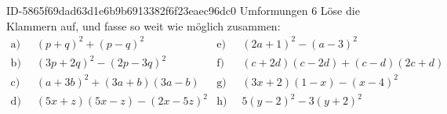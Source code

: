 \begin{exercise}
      {ID-5865f69dad63d1e6b9b6913382f6f23eaec96dc0}
      {Umformungen 6}
  \ifproblem\problem
    \newcommand{\gap}{\;\;}%
    Löse die Klammern auf, und fasse so weit wie möglich zusammen:
    \begin{align*}
      \text{a)}\gap & (p+q)^2+(p-q)^2 &
      \text{e)}\gap & (2a+1)^2-(a-3)^2
      \\
      \text{b)}\gap & (3p+2q)^2-(2p-3q)^2 &
      \text{f)}\gap & (c+2d)(c-2d)+(c-d)(2c+d)
      \\
      \text{c)}\gap & (a+3b)^2+(3a+b)(3a-b) &
      \text{g)}\gap & (3x+2)(1-x)-(x-4)^2
      \\
      \text{d)}\gap & (5x+z)(5x-z)-(2x-5z)^2 &
      \text{h)}\gap & 5(y-2)^2-3(y+2)^2
    \end{align*}
  \fi
  \ifoutcome\outcome
    \newcommand{\toprow}[2]
    {%
      \makebox[1.5em][r]{\ensuremath{\displaystyle#1}}%
      &\phantom{\,=\:\,}%
      \makebox[18.5em][l]{\ensuremath{\displaystyle#2}}%
    }%
    \newcommand{\solutionA}
    {%
      \begin{equation*}
        \begin{split}
          \toprow{\text{a)}}{(p+q)^2+(p-q)^2} \\
          &=p^2+2pq+q^2+p^2-2pq+q^2           \\
          &=p^2+p^2+2pq-2pq+q^2+q^2           \\
          &=2p^2+2q^2                         \\
          &=2\left(p^2+q^2\right)
        \end{split}
      \end{equation*}
    }%
    \newcommand{\solutionB}
    {%
      \begin{equation*}
        \begin{split}
          \toprow{\text{b)}}{(3p+2q)^2-(2p-3q)^2}      \\
          &=9p^2+12pq+4q^2-\left(4p^2-12pq+9q^2\right) \\
          &=9p^2+12pq+4q^2-4p^2+12pq-9q^2              \\
          &=9p^2-4p^2+12pq+12pq+4q^2-9q^2              \\
          &=5p^2+24pq-5q^2
        \end{split}
      \end{equation*}
    }%

\end{exercise}
